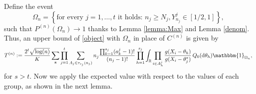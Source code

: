 \documentclass[12pt]{article}
\def \d {\mathrm{d}}
\def\log{\hbox{log}}
\begin{document}
Define the event
\begin{equation}\label{Omega_n}
\Omega_n = \left\{\text{for every $j = 1, \dots, t$ it holds: } n_j \geq N_j, Y^j_{n_j} \in [1/2, 1] \right\},
\end{equation}
such that $P^{(n)}(\Omega_n) \to 1$ thanks to Lemma \ref{lemma:Max} and Lemma \ref{denom}. Thus, an upper bound of \eqref{object} with $\Omega_n$ in place of $C^{(n)}$ is given by
\begin{equation}\label{upper_bound_ratios}
T^{(n)} := \frac{2^t\sqrt{\log(n)}}{K}\sum_{\textbf{s}}\prod_{j = 1}^t\sum_{A_j \in \tau_{s_j}(n_j)}n_j\frac{\prod_{k=1}^{s_j}(a^j_k-1)!}{(n_j-1)!}\prod_{h = 1}^{s_j}\int_{\mathbb{R}}\prod_{i \in A^j_h}\frac{g(X_i - \theta_h)}{g(X_i-\theta_j^*)} \, Q_0(\d \theta_h)\mathbbm{1}_{\Omega_n},
\end{equation}
for $s > t$. Now we apply the expected value with respect to the values of each group, as shown in the next lemma.
\end{document}
